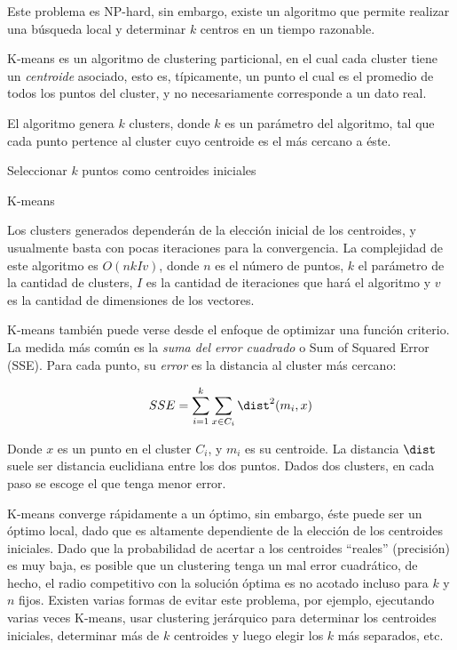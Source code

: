 \documentclass[upright, contnum]{umemoria}
\begin{document}
    Este problema es NP-hard, sin embargo, existe un algoritmo que
    permite realizar una búsqueda local y determinar $k$ centros 
    en un tiempo razonable.
    
    K-means\cite{Lloyd:2006:LSQ:2263356.2269955} es un algoritmo de
    clustering particional, en el cual cada cluster tiene un
    \emph{centroide} asociado, esto es, típicamente, un punto
    el cual es el promedio de todos los puntos del cluster, y no
    necesariamente corresponde a un dato real.
    
    El algoritmo genera $k$ clusters, donde $k$ es un parámetro del
    algoritmo, tal que cada punto pertence al cluster cuyo centroide es el
    más cercano a éste.
    
\begin{algorithm}[H]
 Seleccionar $k$ puntos como centroides iniciales\;
 \caption{K-means}
\end{algorithm}

    Los clusters generados dependerán de la elección inicial de los
    centroides, y usualmente basta con pocas iteraciones para la
    convergencia. La complejidad de este algoritmo es $O(nkIv)$, donde $n$
    es el número de puntos, $k$ el parámetro de la cantidad de clusters,
    $I$ es la cantidad de iteraciones que hará el algoritmo y $v$ es la
    cantidad de dimensiones de los vectores.

    K-means también puede verse desde el enfoque de optimizar una
    función criterio. La medida más común es la 
    \emph{suma del error cuadrado} o Sum of Squared Error (SSE). Para cada
    punto, su \emph{error} es la distancia al cluster más cercano:

    $$SSE = \sum_{i=1}^k\sum_{x\in C_i} \dist^2(m_i,x)$$

    Donde $x$ es un punto en el cluster $C_i$, y $m_i$ es su
    centroide. La distancia $\dist$ suele ser distancia euclidiana
    entre los dos puntos. Dados dos clusters, en cada paso se escoge
    el que tenga menor error.

    K-means converge rápidamente a un óptimo, sin embargo, éste puede
    ser un óptimo local, dado que es altamente dependiente de la
    elección de los centroides iniciales. Dado que la probabilidad de
    acertar a los centroides
    ``reales'' (precisión) es muy baja, es posible que un clustering
    tenga un mal error cuadrático, de hecho, el radio competitivo con
    la solución óptima es no acotado incluso para $k$ y $n$ fijos. 
    Existen varias formas de evitar
    este problema, por ejemplo, ejecutando varias veces K-means, 
    usar clustering jerárquico para determinar los centroides
    iniciales, determinar más de $k$ centroides y luego elegir los $k$
    más separados, etc.
\end{document}
